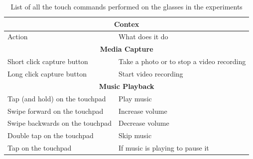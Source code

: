 \begin{table}[H]
    \centering
    \begin{tabular}{|l|l|}
        \hline
        \multicolumn{2}{|c|}{\textbf{Contex}}                                       \\ \hline
        Action                          & What does it do                           \\ \hline
        \multicolumn{2}{|c|}{\textbf{Media Capture}} \\ \hline
        Short click capture button      & Take a photo or to stop a video recording \\ \hline
        Long click capture button       & Start video recording                     \\ \hline
        \multicolumn{2}{|c|}{\textbf{Music Playback}}  \\ \hline
        Tap (and hold) on the touchpad  & Play music                                \\ \hline
        Swipe forward on the touchpad   & Increase volume                           \\ \hline
        Swipe backwards on the touchpad & Decrease volume                           \\ \hline
        Double tap on the touchpad      & Skip music                                \\ \hline
        Tap on the touchpad             & If music is playing to pause it           \\ \hline
    \end{tabular}
    \caption{List of all the touch commands performed on the glasses in the experiments}
    \label{tab:touch_commands}
\end{table}

